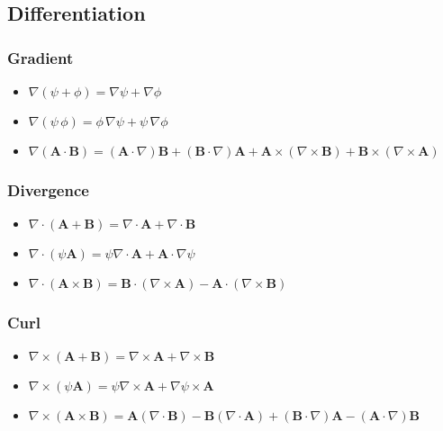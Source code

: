 \subsection{Differentiation}
\subsubsection{Gradient}
\begin{itemize}
\item
  $\nabla(\psi+\phi)=\nabla\psi+\nabla\phi $
\item
  $\nabla (\psi \, \phi) = \phi \,\nabla \psi  + \psi \,\nabla \phi $
\item
  $\nabla\left(\mathbf{A}\cdot\mathbf{B}\right)=
  \left(\mathbf{A}\cdot\nabla\right)\mathbf{B}
  +\left(\mathbf{B}\cdot\nabla\right)\mathbf{A}
  +\mathbf{A}\times\left(\nabla\times\mathbf{B}\right)
  +\mathbf{B}\times\left(\nabla\times\mathbf{A}\right) $
\end{itemize}

\subsubsection{Divergence}
\begin{itemize}
\item
  $\nabla\cdot(\mathbf{A}+\mathbf{B})=
  \nabla\cdot\mathbf{A}+\nabla\cdot\mathbf{B}$
\item
  $\nabla\cdot\left(\psi\mathbf{A}\right)=
  \psi\nabla\cdot\mathbf{A}+\mathbf{A}\cdot\nabla \psi $
\item
  $\nabla\cdot\left(\mathbf{A}\times\mathbf{B}\right)=
  \mathbf{B}\cdot(\nabla\times\mathbf{A})
  -\mathbf{A}\cdot(\nabla\times\mathbf{B})$
\end{itemize}

\subsubsection{Curl}
\begin{itemize}
\item
  $\nabla\times(\mathbf{A}+\mathbf{B})=
  \nabla\times\mathbf{A}+\nabla\times\mathbf{B} $
\item
  $\nabla\times\left(\psi\mathbf{A}\right)=
  \psi\nabla\times\mathbf{A}+\nabla\psi\times\mathbf{A}$
\item
  $\nabla\times\left(\mathbf{A}\times\mathbf{B}\right)=
  \mathbf{A}\left(\nabla\cdot\mathbf{B}\right)
  -\mathbf{B}\left(\nabla\cdot\mathbf{A}\right)
  +\left(\mathbf{B}\cdot\nabla\right)\mathbf{A}
  -\left(\mathbf{A}\cdot\nabla\right)\mathbf{B} $
\end{itemize}

